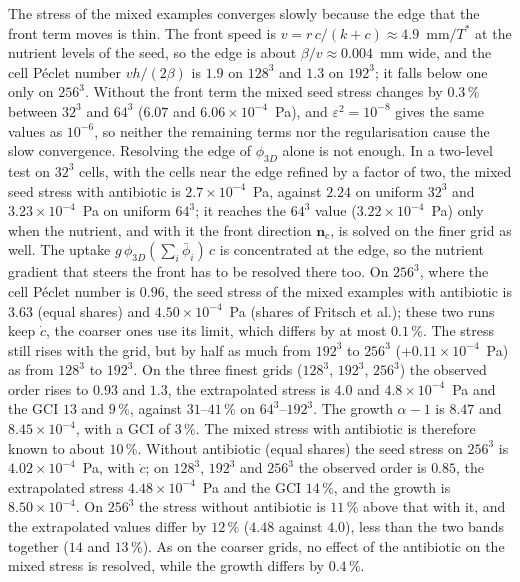 \documentclass[11pt,a4paper]{article}
\newcommand{\phiD}{\phi_{3D}}
\newcommand{\lv}{\textstyle\sum_i\bar\phi_i}
\newcommand{\nc}{\mathbf n_c}
\begin{document}
The stress of the mixed examples converges slowly because the edge that the front term moves is thin. The front speed is $v=r\,c/(k+c)\approx4.9$~mm$/T^*$ at the nutrient levels of the seed, so the edge is about $\beta/v\approx0.004$~mm wide, and the cell P\'eclet number $vh/(2\beta)$ is $1.9$ on $128^3$ and $1.3$ on $192^3$; it falls below one only on $256^3$. Without the front term the mixed seed stress changes by $0.3\,\%$ between $32^3$ and $64^3$ ($6.07$ and $6.06\times10^{-4}$~Pa), and $\varepsilon^2=10^{-8}$ gives the same values as $10^{-6}$, so neither the remaining terms nor the regularisation cause the slow convergence. Resolving the edge of $\phiD$ alone is not enough. In a two-level test on $32^3$ cells, with the cells near the edge refined by a factor of two, the mixed seed stress with antibiotic is $2.7\times10^{-4}$~Pa, against $2.24$ on uniform $32^3$ and $3.23\times10^{-4}$~Pa on uniform $64^3$; it reaches the $64^3$ value ($3.22\times10^{-4}$~Pa) only when the nutrient, and with it the front direction $\nc$, is solved on the finer grid as well. The uptake $g\,\phiD(\lv)\,c$ is concentrated at the edge, so the nutrient gradient that steers the front has to be resolved there too.
On $256^3$, where the cell P\'eclet number is $0.96$, the seed stress of the mixed examples with antibiotic is $3.63$ (equal shares) and $4.50\times10^{-4}$~Pa (shares of Fritsch et al.); these two runs keep $\dot c$, the coarser ones use its limit, which differs by at most $0.1\,\%$. The stress still rises with the grid, but by half as much from $192^3$ to $256^3$ ($+0.11\times10^{-4}$~Pa) as from $128^3$ to $192^3$. On the three finest grids ($128^3$, $192^3$, $256^3$) the observed order rises to $0.93$ and $1.3$, the extrapolated stress is $4.0$ and $4.8\times10^{-4}$~Pa and the GCI $13$ and $9\,\%$, against $31$--$41\,\%$ on $64^3$--$192^3$. The growth $\alpha-1$ is $8.47$ and $8.45\times10^{-4}$, with a GCI of $3\,\%$. The mixed stress with antibiotic is therefore known to about $10\,\%$. Without antibiotic (equal shares) the seed stress on $256^3$ is $4.02\times10^{-4}$~Pa, with $\dot c$; on $128^3$, $192^3$ and $256^3$ the observed order is $0.85$, the extrapolated stress $4.48\times10^{-4}$~Pa and the GCI $14\,\%$, and the growth is $8.50\times10^{-4}$. On $256^3$ the stress without antibiotic is $11\,\%$ above that with it, and the extrapolated values differ by $12\,\%$ ($4.48$ against $4.0$), less than the two bands together ($14$ and $13\,\%$). As on the coarser grids, no effect of the antibiotic on the mixed stress is resolved, while the growth differs by $0.4\,\%$.
\end{document}
